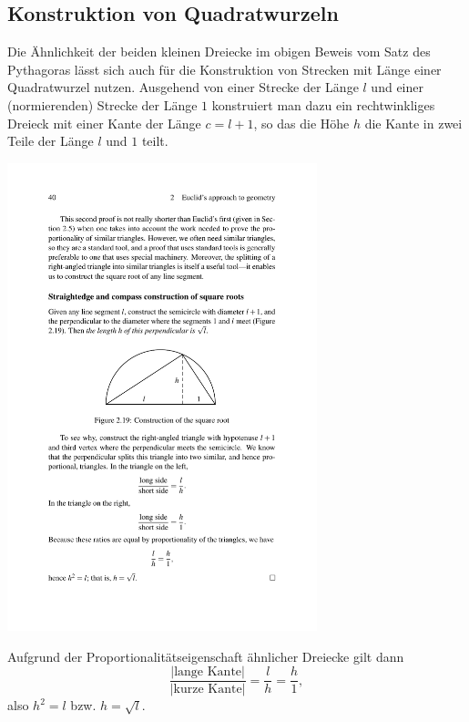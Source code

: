 \subsection*{Konstruktion von Quadratwurzeln}

Die Ähnlichkeit der beiden kleinen Dreiecke im obigen Beweis vom Satz des Pythagoras lässt sich auch
für die Konstruktion von Strecken mit Länge einer Quadratwurzel nutzen.  Ausgehend von einer Strecke
der Länge $l$ und einer (normierenden) Strecke der Länge $1$ konstruiert man dazu ein rechtwinkliges
Dreieck mit einer Kante der Länge $c=l+1$, so das die Höhe $h$ die Kante in zwei Teile der Länge $l$
und $1$ teilt.

\begin{center}
    \includegraphics[width=9cm]{BILDER/BildKonstruktionEinerWurzel.pdf}
\end{center}

Aufgrund der Proportionalitätseigenschaft ähnlicher Dreiecke gilt dann
$$
    \frac{|\mbox{lange Kante}|}{|\mbox{kurze Kante}|}=\frac{l}{h}=\frac{h}{1},
$$
also $h^2=l$ bzw. $h=\sqrt{l}$.


